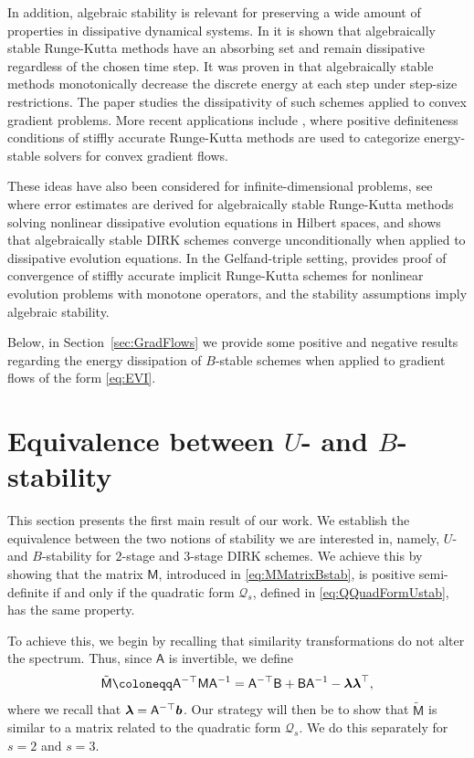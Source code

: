 \documentclass{amsart}
\newcommand{\bflambda}{\mbox{\boldmath$\lambda$}}
\newcommand{\msfA}{\mathsf{A}}
\newcommand{\msfB}{\mathsf{B}}
\newcommand{\msfM}{\mathsf{M}}
\newcommand{\mclQ}{\mathcal{Q}}
\newcommand{\bfb}{\boldsymbol{b}}
\theoremstyle{definition}
\newcommand{\AJS}[1]{#1}
\begin{document}
In addition, algebraic stability is relevant for preserving a wide amount of properties in dissipative dynamical systems. In \cite{MR1293524} it is shown that algebraically stable Runge-Kutta methods have an absorbing set and remain dissipative regardless of the chosen time step. It was proven in \cite{MR3194795} that algebraically stable methods monotonically decrease the discrete energy at each step under step-size restrictions. The paper \cite{MR4121887} studies the dissipativity of such schemes applied to convex gradient problems. More recent applications include \cite{MR4007568}, where positive definiteness conditions of stiffly accurate Runge-Kutta methods are used to categorize energy-stable solvers for convex gradient flows.

These ideas have also been considered for infinite-dimensional problems, see \cite{MR2329662} where error estimates are derived for algebraically stable Runge-Kutta methods solving nonlinear dissipative evolution equations in Hilbert spaces, and \cite{MR2566077} shows that algebraically stable DIRK schemes converge unconditionally when applied to dissipative evolution equations. In the Gelfand-triple setting, \cite{MR2600543} provides proof of convergence of stiffly accurate implicit Runge-Kutta schemes for nonlinear evolution problems with monotone operators, and the stability assumptions imply algebraic stability.

\AJS{Below, in Section~\ref{sec:GradFlows} we provide some positive and negative results regarding the energy dissipation of $B$-stable schemes when applied to gradient flows of the form \eqref{eq:EVI}.  }


\section{Equivalence between $U$- and $B$-stability}
\label{sec:equivalence}

This section presents the first main result of our work. We establish the equivalence  between the two notions of stability we are interested in, namely, $U$- and $B$-stability for $2$-stage and $3$-stage DIRK schemes. We achieve this by showing that the matrix $\msfM$, introduced in \eqref{eq:MMatrixBstab}, is positive semi-definite if and only if the quadratic form $\mclQ_s$, defined in \eqref{eq:QQuadFormUstab}, has the same property.

To achieve this, we begin by recalling that similarity transformations do not alter the spectrum. Thus, since $\msfA$ is invertible, we define
\begin{equation}
\label{eq:Mtilde}
  \tilde{\msfM} \coloneqq \msfA^{-\top}\msfM\msfA^{-1} = \msfA^{-\top}\msfB + \msfB\msfA^{-1} - \bflambda\bflambda^\top,
\end{equation}
where we recall that $\bflambda = \msfA^{-\top} \bfb$. Our strategy will then be to show that $\tilde{\msfM}$ is similar to a matrix related to the quadratic form $\mclQ_s$. We do this separately for $s = 2$ and $s=3$.
\end{document}
